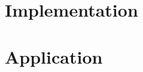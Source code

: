 \documentclass[%
  a4paper,
  twoside,
  numbers=noenddot,
  parskip=half,
  open=any,
  headsepline,
  english, %
  ba  %
]{zhawthesis}
\begin{document}
%

\label{ch:methodology} %


\chapter{Implementation}
\label{ch:implementation} %


\chapter{Application}
\label{ch:application} %


\label{ch:results} %


\label{ch:discussion} %

\end{document}
